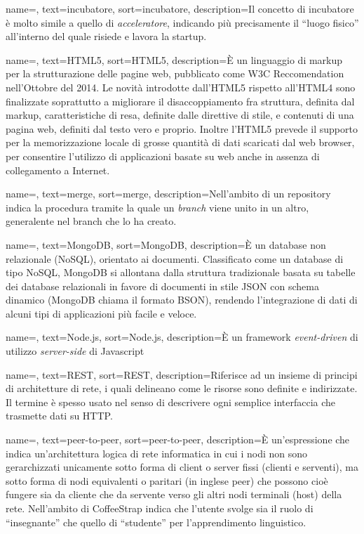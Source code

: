 {
    name=,
    text=incubatore,
    sort=incubatore,
    description={Il concetto di incubatore è molto simile a quello di \textit{acceleratore}, indicando più precisamente il ``luogo fisico'' all'interno del quale risiede e lavora la startup.}
}

{
    name=,
    text=HTML5,
    sort=HTML5,
    description={È un linguaggio di markup per la strutturazione delle pagine web, pubblicato come W3C Reccomendation nell'Ottobre del 2014. Le novità introdotte dall'HTML5 rispetto all'HTML4 sono finalizzate soprattutto a migliorare il disaccoppiamento fra struttura, definita dal markup, caratteristiche di resa, definite dalle direttive di stile, e contenuti di una pagina web, definiti dal testo vero e proprio. Inoltre l'HTML5 prevede il supporto per la memorizzazione locale di grosse quantità di dati scaricati dal web browser, per consentire l'utilizzo di applicazioni basate su web anche in assenza di collegamento a Internet.}
}

{
    name=,
    text=merge,
    sort=merge,
    description={Nell'ambito di un repository indica la procedura tramite la quale un \textit{branch} viene unito in un altro, generalente nel branch che lo ha creato.}
}

{
    name=,
    text=MongoDB,
    sort=MongoDB,
    description={È un database non relazionale (NoSQL), orientato ai documenti. Classificato come un database di tipo NoSQL, MongoDB si allontana dalla struttura tradizionale basata su tabelle dei database relazionali in favore di documenti in stile JSON con schema dinamico (MongoDB chiama il formato BSON), rendendo l'integrazione di dati di alcuni tipi di applicazioni più facile e veloce.}
}

{
    name=,
    text=Node.js,
    sort=Node.js,
    description={È un framework \textit{event-driven} di utilizzo \textit{server-side} di Javascript}
}

{
    name=,
    text=REST,
    sort=REST,
    description={Riferisce ad un insieme di principi di architetture di rete, i quali delineano come le risorse sono definite e indirizzate. Il termine è spesso usato nel senso di descrivere ogni semplice interfaccia che trasmette dati su HTTP.}
}

{
    name=,
    text=peer-to-peer,
    sort=peer-to-peer,
    description={È un'espressione che indica un'architettura logica di rete informatica in cui i nodi non sono gerarchizzati unicamente sotto forma di client o server fissi (clienti e serventi), ma sotto forma di nodi equivalenti o paritari (in inglese peer) che possono cioè fungere sia da cliente che da servente verso gli altri nodi terminali (host) della rete. Nell'ambito di CoffeeStrap indica che l'utente svolge sia il ruolo di ``insegnante'' che quello di ``studente'' per l'apprendimento linguistico.}
}

